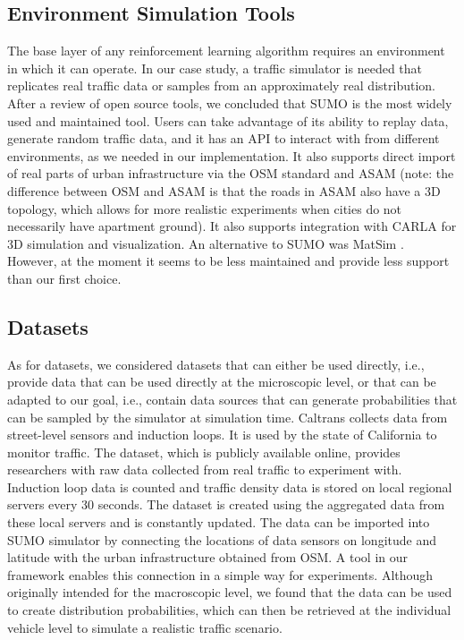 \documentclass[a4paper,twoside]{article}
\begin{document}
\subsection {Environment Simulation Tools}

The base layer of any reinforcement learning algorithm requires an environment in which it can operate. In our case study, a traffic simulator is needed that replicates real traffic data or samples from an approximately real distribution. After a review of open source tools, we concluded that SUMO \cite{SUMMO} is the most widely used and maintained tool. Users can take advantage of its ability to replay data, generate random traffic data, and it has an API to interact with from different environments, as we needed in our implementation. It also supports direct import of real parts of urban infrastructure via the OSM standard \cite{OSRM} and ASAM \cite{ASAM} (note: the difference between OSM and ASAM is that the roads in ASAM also have a 3D topology, which allows for more realistic experiments when cities do not necessarily have apartment ground). It also supports integration with CARLA \cite{dosovitskiy2017carla} for 3D simulation and visualization. An alternative to SUMO was MatSim \cite{MATSim}. However, at the moment it seems to be less maintained and provide less support than our first choice.


\subsection {Datasets}
As for datasets, we considered datasets that can either be used directly, i.e., provide data that can be used directly at the microscopic level, or that can be adapted to our goal, i.e., contain data sources that can generate probabilities that can be sampled by the simulator at simulation time. 
Caltrans \cite{Calt} collects data from street-level sensors and induction loops. It is used by the state of California to monitor traffic. The dataset, which is publicly available online, provides researchers with raw data collected from real traffic to experiment with. Induction loop data is counted and traffic density data is stored on local regional servers every 30 seconds. The dataset is created using the aggregated data from these local servers and is constantly updated. The data can be imported into SUMO simulator by connecting the locations of data sensors on longitude and latitude with the urban infrastructure obtained from OSM. A tool in our framework enables this connection in a simple way for experiments. Although originally intended for the macroscopic level, we found that the data can be used to create distribution probabilities, which can then be retrieved at the individual vehicle level to simulate a realistic traffic scenario.
\end{document}
